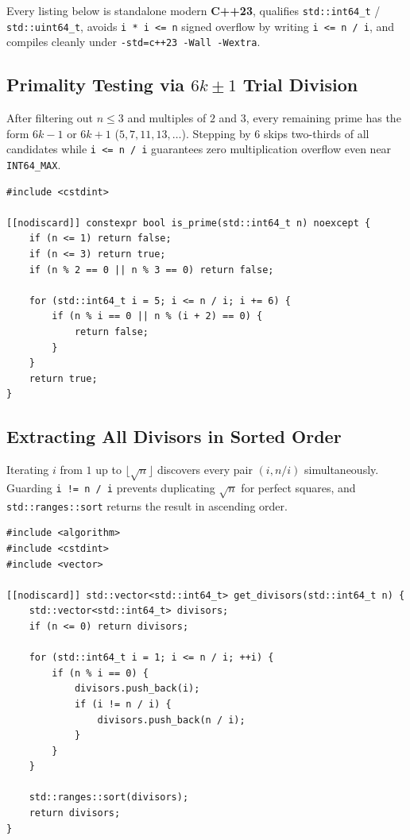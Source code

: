 \documentclass[11pt,a4paper]{article}
\theoremstyle{definition}
\begin{document}
Every listing below is standalone modern \textbf{C++23}, qualifies \texttt{std::int64\_t} / \texttt{std::uint64\_t}, avoids \texttt{i * i <= n} signed overflow by writing \texttt{i <= n / i}, and compiles cleanly under \texttt{-std=c++23 -Wall -Wextra}.

\subsection{Primality Testing via \texorpdfstring{$6k \pm 1$}{6k +/- 1} Trial Division}

After filtering out $n \le 3$ and multiples of $2$ and $3$, every remaining prime has the form $6k - 1$ or $6k + 1$ ($5, 7, 11, 13, \dots$). Stepping by $6$ skips two-thirds of all candidates while \texttt{i <= n / i} guarantees zero multiplication overflow even near \texttt{INT64\_MAX}.

\begin{lstlisting}[caption={$O(\sqrt{n})$ Overflow-Safe Primality Testing ($6k \pm 1$)}]
#include <cstdint>

[[nodiscard]] constexpr bool is_prime(std::int64_t n) noexcept {
    if (n <= 1) return false;
    if (n <= 3) return true;
    if (n % 2 == 0 || n % 3 == 0) return false;

    for (std::int64_t i = 5; i <= n / i; i += 6) {
        if (n % i == 0 || n % (i + 2) == 0) {
            return false;
        }
    }
    return true;
}
\end{lstlisting}

\subsection{Extracting All Divisors in Sorted Order}

Iterating $i$ from $1$ up to $\lfloor\sqrt{n}\rfloor$ discovers every pair $(i, n / i)$ simultaneously. Guarding \texttt{i != n / i} prevents duplicating $\sqrt{n}$ for perfect squares, and \texttt{std::ranges::sort} returns the result in ascending order.

\begin{lstlisting}[caption={Extracting All Positive Divisors in $O(\sqrt{n})$ Time}]
#include <algorithm>
#include <cstdint>
#include <vector>

[[nodiscard]] std::vector<std::int64_t> get_divisors(std::int64_t n) {
    std::vector<std::int64_t> divisors;
    if (n <= 0) return divisors;

    for (std::int64_t i = 1; i <= n / i; ++i) {
        if (n % i == 0) {
            divisors.push_back(i);
            if (i != n / i) {
                divisors.push_back(n / i);
            }
        }
    }

    std::ranges::sort(divisors);
    return divisors;
}
\end{lstlisting}
\end{document}
